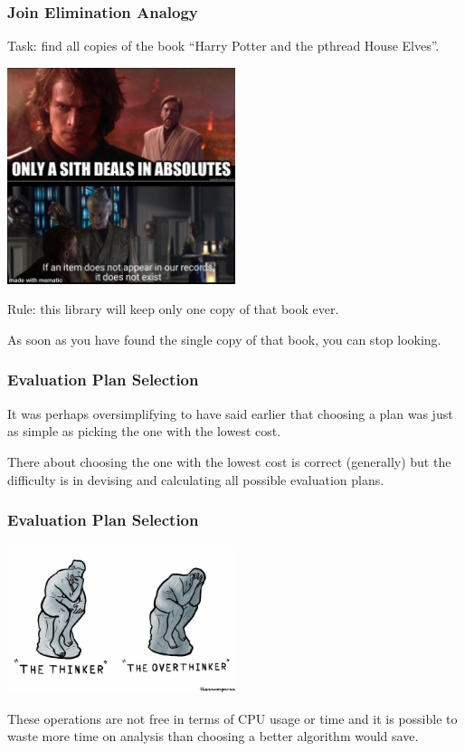 \begin{frame}
\frametitle{Join Elimination Analogy}
Task: find all copies of the book ``Harry Potter and the pthread House Elves''. 


\begin{center}
	\includegraphics[width=0.5\textwidth]{images/archives.jpg}
\end{center}

Rule: this library will keep only one copy of that book ever. 

As soon as you have found the single copy of that book, you can stop looking.

\end{frame}


\begin{frame}
\frametitle{Evaluation Plan Selection}

It was perhaps oversimplifying to have said earlier that choosing a plan was just as simple as picking the one with the lowest cost. 


There about choosing the one with the lowest cost is correct (generally) but the difficulty is in devising and calculating all possible evaluation plans. 

\end{frame}


\begin{frame}
\frametitle{Evaluation Plan Selection}


\begin{center}
	\includegraphics[width=0.5\textwidth]{images/overthink.jpg}
\end{center}

These operations are not free in terms of CPU usage or time and it is possible to waste more time on analysis than choosing a better algorithm would save. 

\end{frame}


